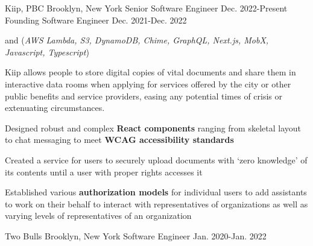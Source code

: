 

\begin{cventries}


  \nrolecventrynoitems
    {Kiip, PBC} %
    {Brooklyn, New York} %
    {Senior Software Engineer} %
    {Dec. 2022-Present} %
    {Founding Software Engineer} %
    {Dec. 2021-Dec. 2022} %
    {} %
    {} %

  \cvcustombodydescription
    { and  (\emph{AWS Lambda, S3, DynamoDB, Chime, GraphQL, Next.js, MobX, Javascript, Typescript})}
    {
      \begin{cvtightprose} %
        {Kiip allows people to store digital copies of vital documents and share them in interactive data rooms when applying for services offered by the city or other public benefits and service providers, easing any potential times of crisis or extenuating circumstances.}
      \end{cvtightprose}
    }
    {
      \begin{cvitems} %
        \item {Designed robust and complex \textbf{React components} ranging from skeletal layout to chat messaging to meet \textbf{WCAG accessibility standards}}
        \item {Created a service for users to securely upload documents with `zero knowledge' of its contents until a user with proper rights accesses it}
        \item {Established various \textbf{authorization models} for individual users to add assistants to work on their behalf to interact with representatives of organizations as well as varying levels of representatives of an organization}
      \end{cvitems}
    }

  \nrolecventrynoitems
    {Two Bulls} %
    {Brooklyn, New York} %
    {Software Engineer} %
    {Jan. 2020-Jan. 2022} %
    {} %
    {} %
    {} %
    {} %


\end{cventries}
